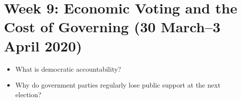 \documentclass[abstract=on,parskip=full,headings=standardclasses,fontsize=11pt,paper=a4]{scrartcl}
\begin{document}

\section{Week 9: Economic Voting and the Cost of Governing (30 March--3 April 2020)}


\begin{itemize}
\renewcommand\labelitemi{--}
\item What is democratic accountability?
\item Why do government parties  regularly lose public support at the next election?
\end{itemize}
\end{document}
